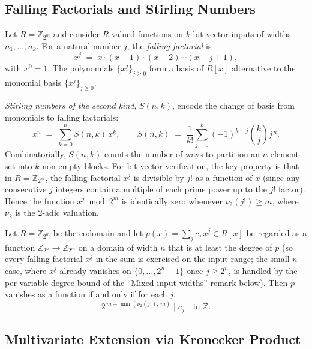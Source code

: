 \documentclass[runningheads]{llncs}
\begin{document}
\subsection{Falling Factorials and Stirling Numbers}
\label{sec:vanishing-falling}

Let $R = \mathbb{Z}_{2^m}$ and consider $R$-valued functions on
$k$ bit-vector inputs of widths $n_1, \ldots, n_k$. For a natural
number $j$, the \emph{falling factorial} is
\[
  x^{\underline{j}} \;=\; x \cdot (x{-}1) \cdot (x{-}2) \cdots (x{-}j{+}1),
\]
with $x^{\underline{0}} = 1$. The polynomials $\{x^{\underline{j}}\}_{j \geq 0}$
form a basis of $R[x]$ alternative to the monomial basis
$\{x^j\}_{j \geq 0}$.

\emph{Stirling numbers of the second kind}, $S(n,k)$, encode the
change of basis from monomials to falling factorials:
\[
  x^n \;=\; \sum_{k=0}^{n} S(n,k) \, x^{\underline{k}},
  \qquad S(n,k) \;=\; \frac{1}{k!} \sum_{j=0}^{k} (-1)^{k-j}
                       \binom{k}{j} j^{\,n}.
\]
Combinatorially, $S(n,k)$ counts the number of ways to partition
an $n$-element set into $k$ non-empty blocks. For bit-vector
verification, the key property is that in $R = \mathbb{Z}_{2^m}$,
the falling factorial $x^{\underline{j}}$ is divisible by $j!$ as a
function of $x$ (since any consecutive $j$ integers contain a
multiple of each prime power up to the $j!$ factor). Hence the
function $x^{\underline{j}} \bmod 2^m$ is identically zero whenever
$\nu_2(j!) \geq m$, where $\nu_2$ is the 2-adic valuation.

\begin{theorem}
\label{thm:vanishing}
Let $R = \mathbb{Z}_{2^m}$ be the codomain and let $p(x) = \sum_j
c_j \, x^{\underline{j}} \in R[x]$ be regarded as a function
$\mathbb{Z}_{2^n} \to \mathbb{Z}_{2^m}$ on a domain of width $n$
that is at least the degree of $p$ (so every falling factorial
$x^{\underline{j}}$ in the sum is exercised on the input range;
the small-$n$ case, where $x^{\underline{j}}$ already vanishes on
$\{0,\ldots,2^n-1\}$ once $j \geq 2^n$, is handled by the
per-variable degree bound of the ``Mixed input widths'' remark
below). Then $p$ vanishes as a function if and only if for each
$j$,
\[
  2^{\,m - \min(\nu_2(j!),\,m)} \;\big|\; c_j \quad\text{in }\mathbb{Z}.
\]
\end{theorem}

\subsection{Multivariate Extension via Kronecker Product}
\label{sec:vanishing-kron}
\end{document}
